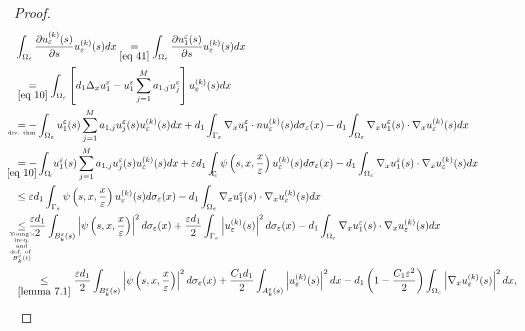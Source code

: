 \begin{proof}
\begin{equation}
  \begin{aligned}
        &\int_{\Omega_{\epsilon}} \frac{\partial u_{\epsilon}^{(k)}(s)}{\partial s} u_{\epsilon}^{(k)}(s)  dx \underset{\eqref{eq 41}}{=}\int_{\Omega_{\epsilon}} \frac{\partial u_{1}^{\epsilon}(s)}{\partial s} u_{\epsilon}^{(k)}(s)  dx \\
        &\underset{\eqref{eq 10}}{=}\int_{\Omega_{\epsilon}}\left[d_{1} \Delta_{x} u_{1}^{\epsilon}-u_{1}^{\epsilon} \sum_{j=1}^{M} a_{1, j} u_{j}^{\epsilon}\right] u_{\epsilon}^{(k)}(s)  dx \\
        &\underset{\mathclap{\text{\tiny div. thm}}}{=}-\int_{\Omega_{\epsilon}} u_{1}^{\epsilon}(s) \sum_{j=1}^{M} a_{1, j} u_{j}^{\epsilon}(s) u_{\epsilon}^{(k)}(s)  dx+d_{1} \int_{\Gamma_{\epsilon}} \nabla_{x} u^{\epsilon}_1 \cdot n u_{\epsilon}^{(k)}(s)  {d} \sigma_{\epsilon}(x)-d_{1} \int_{\Omega_{\epsilon}} \nabla_{x} u_{1}^{\epsilon}(s) \cdot \nabla_{x} u_{\epsilon}^{(k)}(s)  dx \\
        &\underset{\mathclap{\eqref{eq 10}}}{=}-\int_{\Omega_{\mathclap{\epsilon}}} u_{1}^{\epsilon}(s) \sum_{j=1}^{M} a_{1, j} u_{j}^{\epsilon}(s) u_{\epsilon}^{(k)}(s) {d} x+\epsilon d_{1} \int_{\mathclap{\Gamma}_{\epsilon}} \psi\left(s, x, \frac{x}{\epsilon}\right) u_{\epsilon}^{(k)}(s)  {d}\sigma_{\epsilon}(x) -d_{1} \int_{\Omega_{\epsilon}} \nabla_{x} u_{1}^{\epsilon}(s) \cdot \nabla_{x} u_{\epsilon}^{(k)}(s)  {d} x \\
        &\leq \epsilon d_{1} \int_{\Gamma_{\epsilon}} \psi\left(s, x, \frac{x}{\epsilon}\right) u_{\epsilon}^{(k)}(s)  {d} \sigma_{\epsilon}(x)-d_{1} \int_{\Omega_{\epsilon}} \nabla_{x} u_{1}^{\epsilon}(s) \cdot \nabla_{x} u_{\epsilon}^{(k)}(s)  {d} x \\
        &\underset{\mathclap{\tiny \substack{\text{Young's} \\ \text{ineq.}\\\text{and}\\\text{def. of } \\ B_{k}^{\epsilon}(t)}}}{\leq} \frac{\epsilon d_{1}}{2} \int_{B_{k}^{\epsilon}(s)}\left|\psi\left(s, x, \frac{x}{\epsilon}\right)\right|^{2}  {d} \sigma_{\epsilon}(x)+\frac{\epsilon d_{1}}{2} \int_{\Gamma_{\epsilon}}\left|u_{\epsilon}^{(k)}(s)\right|^{2}  {d} \sigma_{\epsilon}(x) -d_{1} \int_{\Omega_{\epsilon}} \nabla_{x} u_{1}^{\epsilon}(s) \cdot \nabla_{x} u_{\epsilon}^{(k)}(s) {d} x \\
        &\underset{\eqref{lemma 7.1}}{\leq} \frac{\epsilon d_{1}}{2} \int_{B_{k}^{\epsilon}(s)}\left|\psi\left(s, x, \frac{x}{\epsilon}\right)\right|^{2} {d} \sigma_{\epsilon}(x)+\frac{C_{1} d_{1}}{2} \int_{A_{k}^{\epsilon}(s)}\left|u_{\epsilon}^{(k)}(s)\right|^{2} {d} x -d_{1}\left(1-\frac{C_{1} \epsilon^{2}}{2}\right) \int_{\Omega_{\epsilon}}\left|\nabla_{x} u_{\epsilon}^{(k)}(s)\right|^{2}{d} x,

\end{aligned}
\end{equation}
\end{proof}
